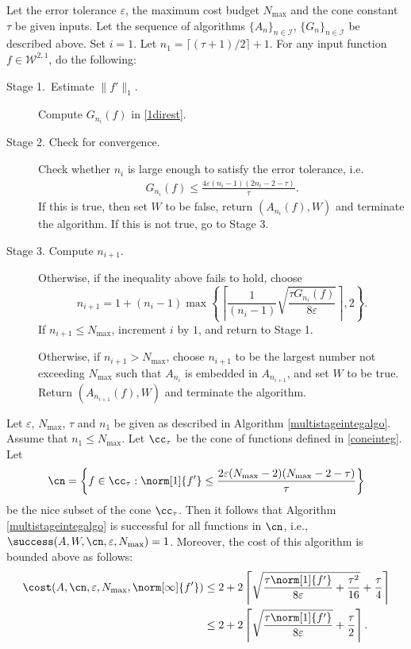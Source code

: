 \begin{algo} \label{multistageintegalgo}
Let the error tolerance $\varepsilon$, the maximum cost budget $N_{\text{max}}$ and the cone constant $\tau$ be given inputs. Let the sequence of algorithms $\{A_n\}_{n\in \mathcal{I}}$, $\{G_n\}_{n\in \mathcal{I}}$ be described above. Set $i=1$. Let $n_1=\lceil(\tau+1)/2\rceil+1$. For any input function $f\in \mathcal{W}^{2,1}$, do the following:
\begin{description}
\item[Stage 1.\ Estimate {$\|f'\|_{1}$}.] Compute $G_{n_i}(f)$ in \eqref{1direst}.

\item[Stage 2. Check for convergence.] Check whether $n_i$ is large enough to satisfy the error tolerance, i.e.
    \begin{align*}
     G_{n_i}(f) \le \frac{4\varepsilon(n_i-1)(2n_i-2 - \tau)}{\tau}.
    \end{align*}
    If this is true, then set $W$ to be false, return $(A_{n_i}(f),W)$ and terminate the algorithm. If this is not true, go to Stage 3.

\item[Stage 3. Compute $n_{i+1}$.] Otherwise, if the inequality above fails to hold,
choose
$$
n_{i+1}=1+ (n_i-1)\max\left\{\left\lceil\frac{1}{(n_i-1)}\sqrt{\frac{\tau G_{n_i}(f)}{8\varepsilon}}\right\rceil,2\right\}.
$$
If $n_{i+1} \le N_{\max}$, increment $i$ by $1$, and return to Stage 1.

Otherwise, if $n_{i+1} > N_{\max}$, choose $n_{i+1}$ to be the largest number not exceeding $N_{\max}$ such that $A_{n_{i}}$ is embedded in $A_{n_{i+1}}$, and set $W$ to be true. Return $(A_{n_{i+1}}(f),W)$ and terminate the algorithm.
\end{description}
\end{algo}

\begin{theorem} Let  $\varepsilon$, $N_{\max}$, $\tau$ and $n_1$ be given as described in Algorithm \ref{multistageintegalgo}.  Assume that $n_1 \le N_{\max}$.  Let $\cc_\tau$ be the cone of functions defined in \eqref{coneinteg}.  Let
$$
\cn
= \left \{ f \in \cc_\tau : \norm[1]{f'} \le \frac{2\varepsilon (N_{\max}-2)(N_{\max}-2 -\tau)}{\tau} \right\}
$$
be the nice subset of the cone $\cc_\tau$.  Then it follows that Algorithm \ref{multistageintegalgo} is successful for all functions in $\cn$,  i.e.,  $\success(A,W,\cn,\varepsilon,N_{\max}) = 1$.  Moreover, the cost of this algorithm is bounded above as follows:
\begin{align*}
\cost(A,\cn,\varepsilon,N_{\max},\norm[\infty]{f'})
&\le 2+2 \left \lceil \sqrt{\frac{\tau \norm[1]{f'}}{8\varepsilon} + \frac{\tau^2 }{16}} + \frac{\tau}{4} \right\rceil \\
&\le 2+2 \left \lceil\sqrt{\frac{\tau \norm[1]{f'}}{8\varepsilon}} + \frac{\tau}{2} \right \rceil.
\end{align*}
\end{theorem}

